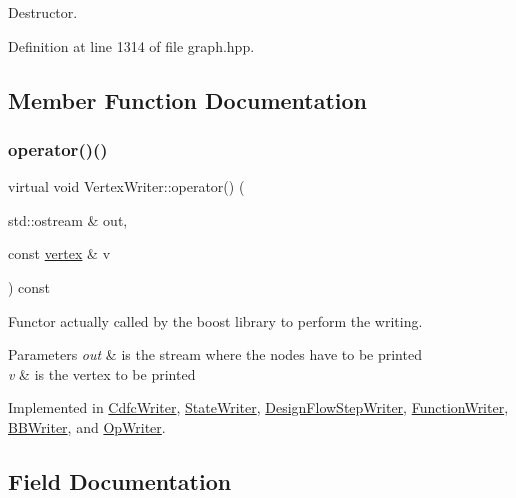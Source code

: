 Destructor. 



Definition at line 1314 of file graph.\+hpp.



\subsection{Member Function Documentation}
\mbox{\label{classVertexWriter_a9df92a65d6e59d160be56eb8ec5cb84c}} 
\subsubsection{\texorpdfstring{operator()()}{operator()()}}
{\footnotesize\ttfamily virtual void Vertex\+Writer\+::operator() (\begin{DoxyParamCaption}\item[{std\+::ostream \&}]{out,  }\item[{const \hyperlink{graph_8hpp_abefdcf0544e601805af44eca032cca14}{vertex} \&}]{v }\end{DoxyParamCaption}) const\hspace{0.3cm}{\ttfamily [pure virtual]}}



Functor actually called by the boost library to perform the writing. 


\begin{DoxyParams}{Parameters}
{\em out} & is the stream where the nodes have to be printed \\
\hline
{\em v} & is the vertex to be printed \\
\hline
\end{DoxyParams}


Implemented in \hyperlink{classCdfcWriter_a8430da34044c0c57b7ccda0a2720dc04}{Cdfc\+Writer}, \hyperlink{classStateWriter_a2c861e031d9bba75843879f2c9dd098f}{State\+Writer}, \hyperlink{classDesignFlowStepWriter_a0d8ca8f65142a1331981d839462d8395}{Design\+Flow\+Step\+Writer}, \hyperlink{classFunctionWriter_af935396f9e2d8a4ac426655ab37bcb39}{Function\+Writer}, \hyperlink{classBBWriter_a04cb324b25410008893d31a21d347f2f}{B\+B\+Writer}, and \hyperlink{classOpWriter_a58cae1db8599d723605d387a61c0c967}{Op\+Writer}.



\subsection{Field Documentation}
\mbox{\label{classVertexWriter_aa22b6ea9c9a75b7fce3767b00e08ed3f}} 
